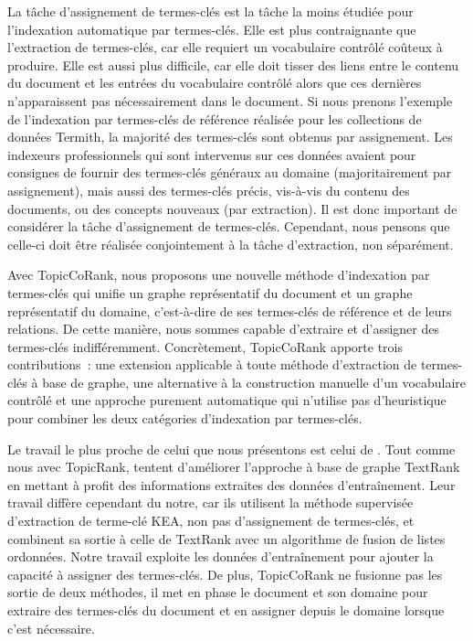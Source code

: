     La tâche d'assignement de termes-clés est la tâche la moins étudiée pour
    l'indexation automatique par termes-clés. Elle est plus contraignante que
    l'extraction de termes-clés, car elle requiert un vocabulaire contrôlé
    coûteux à produire. Elle est aussi plus difficile, car elle doit tisser des
    liens entre le contenu du document et les entrées du vocabulaire contrôlé
    alors que ces dernières n'apparaissent pas nécessairement dans le document.
    Si nous prenons l'exemple de l'indexation par termes-clés de référence
    réalisée pour les collections de données Termith, la majorité des
    termes-clés sont obtenus par assignement. Les indexeurs professionnels qui
    sont intervenus sur ces données avaient pour consignes de fournir des
    termes-clés généraux au domaine (majoritairement par assignement), mais
    aussi  des termes-clés précis, vis-à-vis du contenu des documents, ou des
    concepts nouveaux (par extraction). Il est donc important de considérer la
    tâche d'assignement de termes-clés. Cependant, nous pensons que celle-ci
    doit être réalisée conjointement à la tâche d'extraction, non séparément.

    Avec TopicCoRank, nous proposons une nouvelle méthode d'indexation par
    termes-clés qui unifie un graphe représentatif du document et un graphe
    représentatif du domaine, c'est-à-dire de ses termes-clés de référence et de
    leurs relations. De cette manière, nous sommes capable d'extraire et
    d'assigner des termes-clés indifféremment. Concrètement, TopicCoRank apporte
    trois contributions~: une extension applicable à toute méthode d'extraction
    de termes-clés à base de graphe, une alternative à la construction manuelle
    d'un vocabulaire contrôlé et une approche purement automatique qui n'utilise
    pas d'heuristique pour combiner les deux catégories d'indexation par
    termes-clés.
        
    Le travail le plus proche de celui que nous présentons est celui de
    . Tout comme nous avec TopicRank,
     tentent d'améliorer l'approche à
    base de graphe TextRank en mettant à profit des informations extraites des
    données d'entraînement. Leur travail diffère cependant du notre, car ils
    utilisent la méthode supervisée d'extraction de terme-clé KEA, non pas
    d'assignement de termes-clés, et combinent sa sortie à celle de TextRank
    avec un algorithme de fusion de listes ordonnées. Notre travail exploite les
    données d'entraînement pour ajouter la capacité à assigner des termes-clés.
    De plus, TopicCoRank ne fusionne pas les sortie de deux méthodes, il met en
    phase le document et son domaine pour extraire des termes-clés du document
    et en assigner depuis le domaine lorsque c'est nécessaire.

